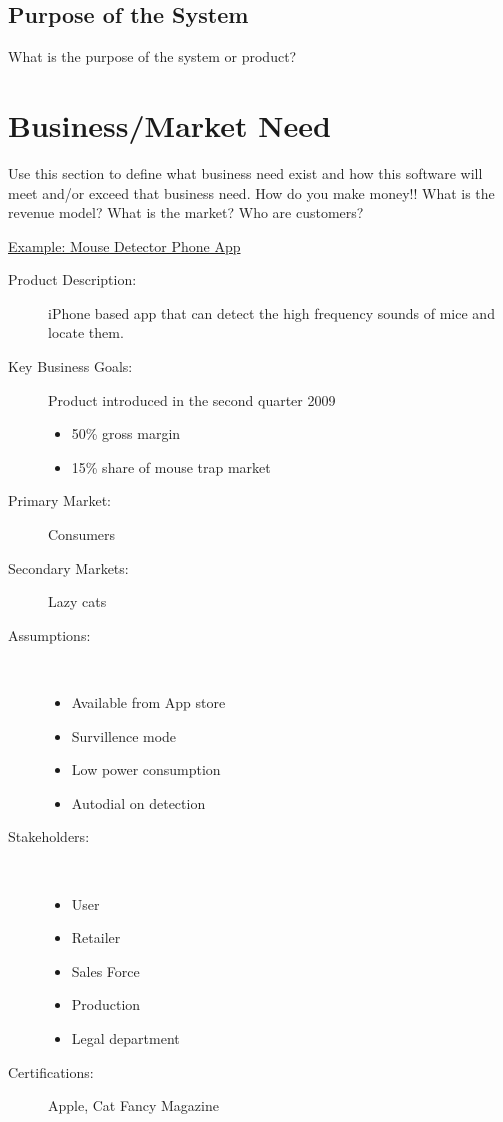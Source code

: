\subsection{Purpose of the System}
What is the purpose of the system or product? 


\section{Business/Market Need}
Use this section to define what business need exist and how this software will 
meet and/or exceed that business need.    How do you make money!!  What is the revenue model?  What is the market? Who are customers?

\noindent
\underline{Example:  Mouse Detector Phone App}

\begin{description}
\item [Product Description:] iPhone based app that can detect the high frequency sounds of mice and locate them.

\item [Key Business Goals:] Product introduced in the second quarter 2009
\begin{itemize}
\item 50\% gross margin
\item 15\% share of mouse trap market
\end{itemize}

\item [Primary Market:] Consumers
\item [Secondary Markets:] Lazy cats

\item [Assumptions:]  ~~ \\
\begin{itemize}
\item Available from App store
\item Survillence mode
\item Low power consumption
\item Autodial on detection
\end{itemize}

\item [Stakeholders:]  ~~ \\
\begin{itemize}
\item User
\item Retailer
\item Sales Force
\item Production
\item Legal department
\end{itemize}

\item [Certifications:] Apple, Cat Fancy Magazine
\end{description}

